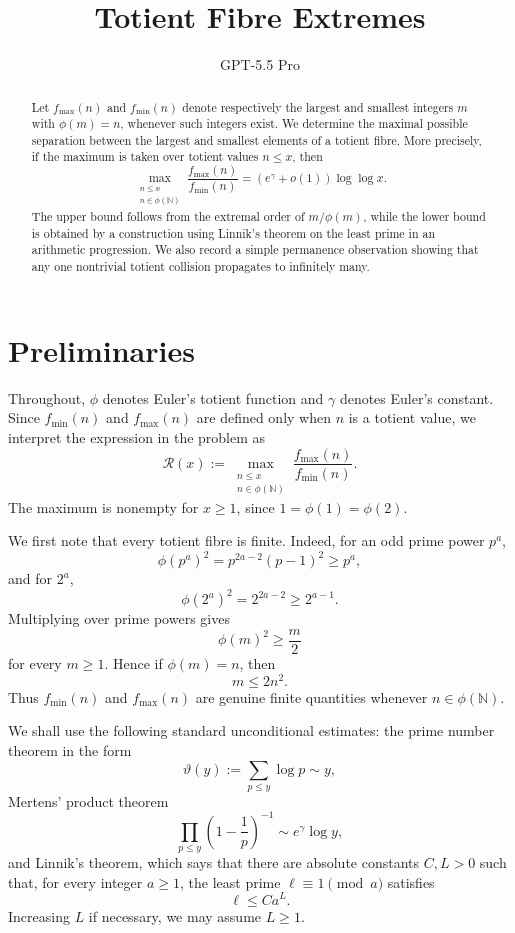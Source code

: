 \documentclass[11pt,a4paper]{amsart}
\title{Totient Fibre Extremes}
\author{GPT-5.5 Pro}
\newcommand{\N}{\mathbb N}
\begin{document}
\begin{abstract}
Let \(f_{\max}(n)\) and \(f_{\min}(n)\) denote respectively the largest and smallest integers \(m\) with \(\phi(m)=n\), whenever such integers exist. We determine the maximal possible separation between the largest and smallest elements of a totient fibre. More precisely, if the maximum is taken over totient values \(n\le x\), then
\[
\max_{\substack{n\le x\\ n\in \phi(\N)}}\frac{f_{\max}(n)}{f_{\min}(n)}
=(e^\gamma+o(1))\log\log x .
\]
The upper bound follows from the extremal order of \(m/\phi(m)\), while the lower bound is obtained by a construction using Linnik's theorem on the least prime in an arithmetic progression. We also record a simple permanence observation showing that any one nontrivial totient collision propagates to infinitely many.
\end{abstract}

\maketitle

\section{Preliminaries}

Throughout, \(\phi\) denotes Euler's totient function and \(\gamma\) denotes Euler's constant. Since \(f_{\min}(n)\) and \(f_{\max}(n)\) are defined only when \(n\) is a totient value, we interpret the expression in the problem as
\[
\mathcal R(x):=
\max_{\substack{n\le x\\ n\in \phi(\N)}}
\frac{f_{\max}(n)}{f_{\min}(n)} .
\]
The maximum is nonempty for \(x\ge 1\), since \(1=\phi(1)=\phi(2)\).

We first note that every totient fibre is finite. Indeed, for an odd prime power \(p^a\),
\[
\phi(p^a)^2=p^{2a-2}(p-1)^2\ge p^a,
\]
and for \(2^a\),
\[
\phi(2^a)^2=2^{2a-2}\ge 2^{a-1}.
\]
Multiplying over prime powers gives
\[
\phi(m)^2\ge \frac m2
\]
for every \(m\ge 1\). Hence if \(\phi(m)=n\), then
\[
m\le 2n^2.
\]
Thus \(f_{\min}(n)\) and \(f_{\max}(n)\) are genuine finite quantities whenever \(n\in\phi(\N)\).

We shall use the following standard unconditional estimates: the prime number theorem in the form
\[
\vartheta(y):=\sum_{p\le y}\log p \sim y,
\]
Mertens' product theorem
\[
\prod_{p\le y}\left(1-\frac1p\right)^{-1}
\sim e^\gamma \log y,
\]
and Linnik's theorem, which says that there are absolute constants \(C,L>0\) such that, for every integer \(a\ge 1\), the least prime \(\ell\equiv 1\pmod a\) satisfies
\[
\ell\le C a^L.
\]
Increasing \(L\) if necessary, we may assume \(L\ge 1\).
\end{document}
